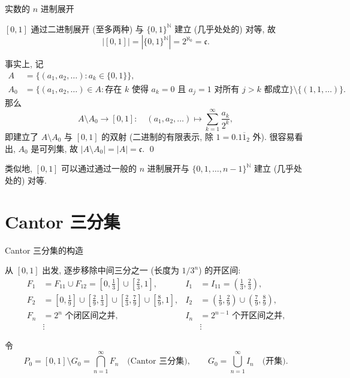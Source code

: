 \begin{frame}{实数的 $n$ 进制展开}

\begin{prop}
$[0,1]$ 通过二进制展开 (至多两种) 与 $\{0,1\}^{\mathbb{N}}$ 建立 (几乎处处的) 对等, 故
\[
|[0,1]| = |\{0,1\}^{\mathbb{N}}| = 2^{\aleph_0} = \mathfrak{c}.
\]
\end{prop}

\pause
\vspace{0.5em}

事实上, 记
\begin{align*}
A & = \{ (a_1, a_2, \ldots) : a_k \in \{0,1\} \}, \\
A_0 & = \{ (a_1, a_2, \ldots) \in A : \text{存在 $k$ 使得 $a_k = 0$ 且 $a_j = 1$ 对所有 $j > k$ 都成立} \} \setminus \{(1,1,\ldots)\}.
\end{align*}
那么
\[
A \setminus A_0 \longrightarrow [0, 1]: \quad (a_1, a_2, \ldots) \mapsto \sum_{k=1}^\infty \frac{a_k}{2^k},
\]
即建立了 $A \setminus A_0$ 与 $[0,1]$ 的双射 (二进制的有限表示, 除 $1 = 0.1\overline{1}_2$ 外). 很容易看出, $A_0$ 是可列集, 故 $|A \setminus A_0| = |A| = \mathfrak{c}.$
\qed

\pause
\vspace{0.5em}

\begin{remark}
类似地, $[0,1]$ 可以通过通过一般的 $n$ 进制展开与 $\{0,1,\ldots,n-1\}^{\mathbb{N}}$ 建立 (几乎处处的) 对等.
\end{remark}

\end{frame}


\section[Cantor 集]{Cantor 三分集}


\begin{frame}{Cantor 三分集的构造}

从 $[0,1]$ 出发, 逐步移除中间三分之一 (长度为 $1/3^n$) 的开区间:
\begin{align*}
F_1 & = F_{11} \cup F_{12} = \left[0, \tfrac{1}{3}\right] \cup \left[\tfrac{2}{3}, 1\right], &
I_1 & = I_{11} = \left(\tfrac{1}{3}, \tfrac{2}{3}\right), \\[3pt]
F_2 & = \left[0, \tfrac{1}{9}\right] \cup \left[\tfrac{2}{9}, \tfrac{1}{3}\right] \cup \left[\tfrac{2}{3}, \tfrac{7}{9}\right] \cup \left[\tfrac{8}{9}, 1\right], &
I_2 & = \left(\tfrac{1}{9}, \tfrac{2}{9}\right) \cup \left(\tfrac{7}{9}, \tfrac{8}{9}\right), \\[3pt]
F_n & = 2^n \text{ 个闭区间之并,} & I_n &= 2^{n-1} \text{ 个开区间之并,} \\[3pt]
& \vdots & & \vdots
\end{align*}

\pause

令
\[
 P_0 = [0,1] \setminus G_0 = \bigcap_{n=1}^{\infty} F_n \quad \text{(Cantor 三分集)}, \qquad
G_0 = \bigcup_{n=1}^{\infty} I_n \quad \text{(开集)}.
\]

\end{frame}


